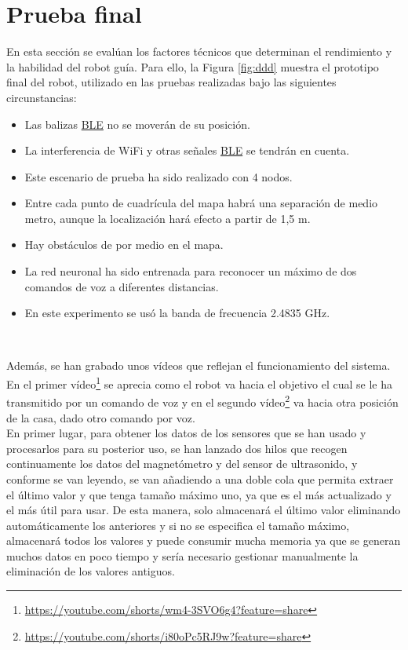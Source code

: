 \section{Prueba final}
\label{prueba_final}



En esta sección se evalúan los factores técnicos que determinan el rendimiento
y la habilidad del robot guía. Para ello, la Figura \ref{fig:ddd} muestra el prototipo final del robot, utilizado en las pruebas realizadas bajo las siguientes circunstancias:

\begin{itemize}
 \item \textit{} Las balizas \hyperlink{BLE}{BLE}  no se moverán de su posición.
 \item \textit{} La interferencia de WiFi y otras señales \hyperlink{BLE}{BLE} se tendrán en cuenta.
 \item \textit{} Este escenario de prueba ha sido realizado con 4 nodos.
 \item \textit{} Entre cada punto de cuadrícula del mapa habrá una separación de medio metro, aunque la localización hará efecto a partir de 1,5 m.
 \item \textit{} Hay obstáculos de por medio en el mapa.
 \item \textit{} La red neuronal ha sido entrenada para reconocer un máximo de dos comandos de voz a diferentes distancias.
 \item \textit{} En este experimento se usó la banda de frecuencia 2.4835 GHz.
\end{itemize}\


Además, se han grabado unos vídeos que reflejan el funcionamiento del sistema. En el primer vídeo\footnote{\url{https://youtube.com/shorts/wm4-3SVO6g4?feature=share}} se aprecia como el robot va hacia el objetivo el cual se le ha transmitido por un comando de voz y en el segundo vídeo\footnote{\url{https://youtube.com/shorts/i80oPc5RJ9w?feature=share}} va hacia otra posición de la casa, dado otro comando por voz.\\

En primer lugar, para obtener los datos de los sensores que se han usado y procesarlos para su posterior uso, se han lanzado dos hilos que recogen continuamente los datos del magnetómetro y del sensor de ultrasonido, y conforme se van leyendo, se van añadiendo a una doble cola que permita extraer el último valor y que tenga tamaño máximo uno, ya que es el más actualizado y el más útil para usar. De esta manera, solo almacenará el último valor eliminando automáticamente los anteriores y si no se especifica el tamaño máximo, almacenará todos los valores y puede consumir mucha memoria ya que se generan muchos datos en poco tiempo y sería necesario gestionar manualmente la eliminación de los valores antiguos.\\

